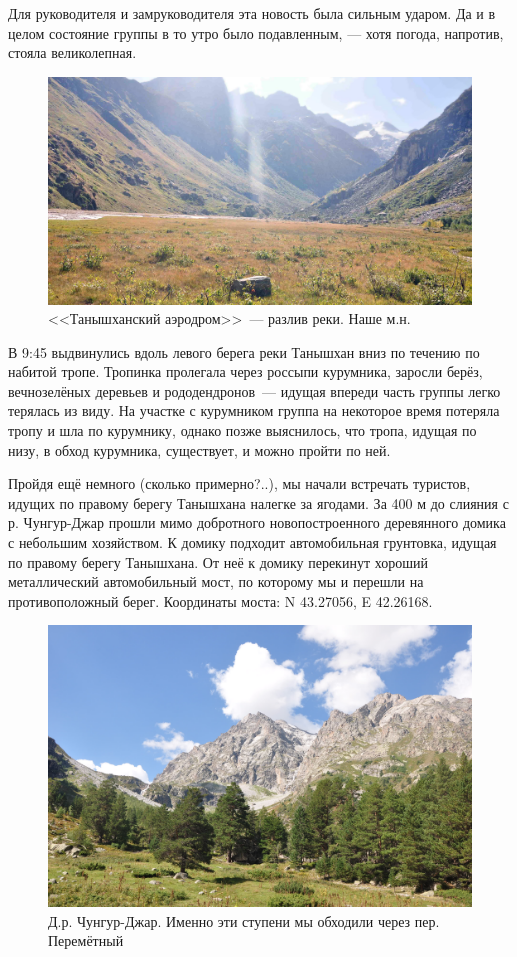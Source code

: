 Для руководителя и замруководителя эта новость была сильным ударом. Да и в целом состояние группы в то утро было подавленным, --- хотя погода, напротив, стояла великолепная.
\begin{figure}[h!]
	\centering
	\includegraphics[width=0.7\linewidth]{../pics/DSC_0434 2.jpg}
	\caption{<<Танышханский аэродром>>~--- разлив реки. Наше м.н.}
	\label{fig:DSC_0434}
\end{figure}

В 9:45 выдвинулись вдоль левого берега реки Танышхан вниз по течению по набитой тропе. Тропинка пролегала через россыпи курумника, заросли берёз, вечнозелёных деревьев  и рододендронов~--- идущая впереди часть группы легко терялась из виду. На участке с курумником группа на некоторое время потеряла тропу и шла по курумнику, однако позже выяснилось, что тропа, идущая по низу, в обход курумника, существует, и можно пройти по ней. 

Пройдя ещё немного \alert{(сколько примерно?..)}, мы начали встречать туристов, идущих по правому берегу Танышхана налегке за ягодами. За 400 м до слияния с р. Чунгур-Джар прошли мимо добротного новопостроенного деревянного домика с небольшим хозяйством. К домику подходит автомобильная грунтовка, идущая по правому берегу Танышхана. От неё к домику перекинут хороший металлический автомобильный мост, по которому мы и перешли на противоположный берег. Координаты моста: N 43.27056\degree, E 42.26168\degree. 
 
\begin{figure}[h!]
	\centering
	\includegraphics[width=0.7\linewidth]{../pics/DSC_0459 2}
	\caption{Д.р. Чунгур-Джар. Именно эти ступени мы обходили через пер. Перемётный}
	\label{fig:DSC_0459}
\end{figure}

